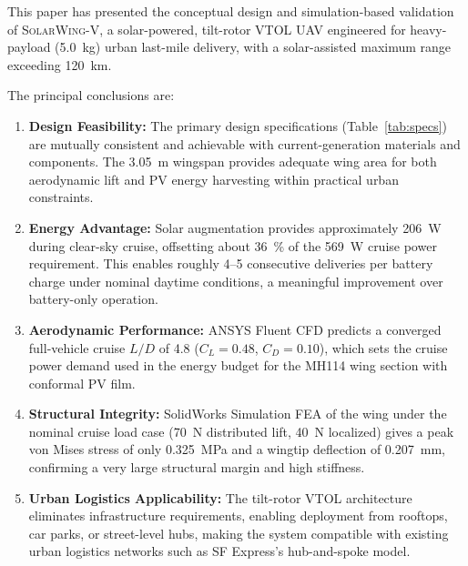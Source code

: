 \documentclass[conference]{IEEEtran}
\newcommand{\UAV}{\textsc{SolarWing-V}}          %
\begin{document}
This paper has presented the conceptual design and simulation-based validation of
\UAV{}, a solar-powered, tilt-rotor VTOL UAV engineered for heavy-payload
(\SI{5.0}{kg}) urban last-mile delivery, with a solar-assisted maximum range exceeding \SI{120}{km}.

The principal conclusions are:

\begin{enumerate}
    \item \textbf{Design Feasibility:} The primary design specifications
          (Table~\ref{tab:specs}) are mutually consistent and achievable with
          current-generation materials and components.
          The \SI{3.05}{m} wingspan provides adequate wing area for both aerodynamic
          lift and PV energy harvesting within practical urban constraints.

    \item \textbf{Energy Advantage:} Solar augmentation provides approximately
          \SI{206}{W} during clear-sky cruise, offsetting about \SI{36}{\%} of the
          \SI{569}{W} cruise power requirement.
          This enables roughly 4--5 consecutive deliveries per battery charge
          under nominal daytime conditions, a meaningful improvement over battery-only operation.

    \item \textbf{Aerodynamic Performance:} ANSYS Fluent CFD predicts a converged
          full-vehicle cruise $L/D$ of 4.8 ($C_L = 0.48$, $C_D = 0.10$), which sets
          the cruise power demand used in the energy budget for the MH114 wing
          section with conformal PV film.

    \item \textbf{Structural Integrity:} SolidWorks Simulation FEA of the wing under
          the nominal cruise load case (\SI{70}{N} distributed lift, \SI{40}{N} localized)
          gives a peak von Mises stress of only \SI{0.325}{MPa} and a wingtip deflection
          of \SI{0.207}{mm}, confirming a very large structural margin and high stiffness.

    \item \textbf{Urban Logistics Applicability:} The tilt-rotor VTOL architecture
          eliminates infrastructure requirements, enabling deployment from rooftops,
          car parks, or street-level hubs, making the system compatible with
          existing urban logistics networks such as SF Express's hub-and-spoke model.
\end{enumerate}
\end{document}
